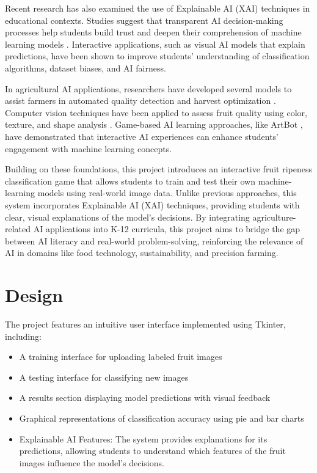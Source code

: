 \documentclass[conference]{IEEEtran}
\begin{document}
Recent research has also examined the use of Explainable AI (XAI) techniques in educational contexts. Studies suggest that transparent AI decision-making processes help students build trust and deepen their comprehension of machine learning models \cite{wu2020, mon2023}. Interactive applications, such as visual AI models that explain predictions, have been shown to improve students' understanding of classification algorithms, dataset biases, and AI fairness.

In agricultural AI applications, researchers have developed several models to assist farmers in automated quality detection and harvest optimization \cite{chen2020}. Computer vision techniques have been applied to assess fruit quality using color, texture, and shape analysis \cite{chen2020}. Game-based AI learning approaches, like ArtBot \cite{pesek2022}, have demonstrated that interactive AI experiences can enhance students’ engagement with machine learning concepts.

Building on these foundations, this project introduces an interactive fruit ripeness classification game that allows students to train and test their own machine-learning models using real-world image data. Unlike previous approaches, this system incorporates Explainable AI (XAI) techniques, providing students with clear, visual explanations of the model's decisions. By integrating agriculture-related AI applications into K-12 curricula, this project aims to bridge the gap between AI literacy and real-world problem-solving, reinforcing the relevance of AI in domains like food technology, sustainability, and precision farming.

\section{Design}
The project features an intuitive user interface implemented using Tkinter, including:
\begin{itemize}
    \item A training interface for uploading labeled fruit images
    \item A testing interface for classifying new images
    \item A results section displaying model predictions with visual feedback
    \item Graphical representations of classification accuracy using pie and bar charts
    \item Explainable AI Features: The system provides explanations for its predictions, allowing students to understand which features of the fruit images influence the model's decisions.
\end{itemize}
\end{document}
